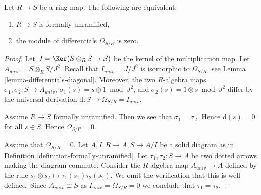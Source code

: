 \begin{lemma}
\label{lemma-characterize-formally-unramified}
Let $R \to S$ be a ring map.
The following are equivalent:
\begin{enumerate}
\item $R \to S$ is formally unramified,
\item the module of differentials $\Omega_{S/R}$ is zero.
\end{enumerate}
\end{lemma}

\begin{proof}
Let $J = \Ker(S \otimes_R S \to S)$ be the kernel of
the multiplication map. Let $A_{univ} = S \otimes_R S/J^2$. Recall
that $I_{univ} = J/J^2$ is isomorphic to $\Omega_{S/R}$, see
Lemma \ref{lemma-differentials-diagonal}. Moreover, the two $R$-algebra maps
$\sigma_1, \sigma_2 : S \to A_{univ}$, $\sigma_1(s) = s \otimes 1 \bmod J^2$,
and $\sigma_2(s) = 1 \otimes s \bmod J^2$ differ by the
universal derivation $\text{d} : S \to \Omega_{S/R} = I_{univ}$.

\medskip\noindent
Assume $R \to S$ formally unramified.
Then we see that $\sigma_1 = \sigma_2$.
Hence $\text{d}(s) = 0$ for all $s \in S$.
Hence $\Omega_{S/R} = 0$.

\medskip\noindent
Assume that $\Omega_{S/R} = 0$. Let $A, I, R \to A, S \to A/I$
be a solid diagram as in Definition \ref{definition-formally-unramified}.
Let $\tau_1, \tau_2 : S \to A$ be two dotted arrows making the
diagram commute. Consider the $R$-algebra map $A_{univ} \to A$
defined by the rule $s_1 \otimes s_2 \mapsto \tau_1(s_1)\tau_2(s_2)$.
We omit the verification that this is well defined. Since $A_{univ} \cong S$
as $I_{univ} = \Omega_{S/R} = 0$ we conclude that $\tau_1 = \tau_2$.
\end{proof}
